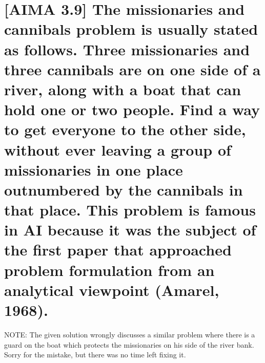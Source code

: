 \documentclass{scrreprt}
\begin{document}
\section*{[AIMA 3.9] The missionaries and cannibals problem is usually stated as follows. Three
missionaries and three cannibals are on one side of a river, along with a boat that can hold one or two
people. Find a way to get everyone to the other side, without ever leaving a group of missionaries
in one place outnumbered by the cannibals in that place. This problem is famous in AI because it
was the subject of the first paper that approached problem formulation from an analytical viewpoint
(Amarel, 1968).}
NOTE: The given solution wrongly discusses a similar problem where there is a guard on the boat which protects the missionaries on his side of the river bank.\\
Sorry for the mistake, but there was no time left fixing it.
\end{document}

